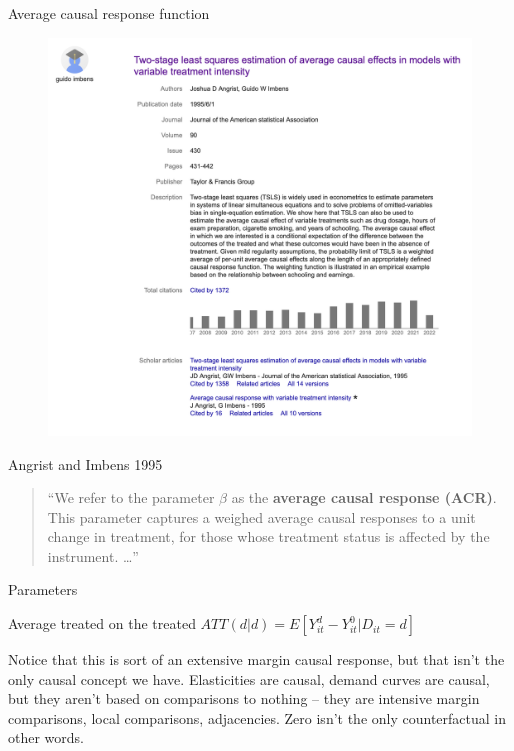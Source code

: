 \documentclass{beamer}
\begin{document}
\begin{frame}{Average causal response function}

\begin{figure}
\begin{center}
             \includegraphics[scale=0.3]{./lecture_includes/angrist_imbens_IV_intensity}
\end{center}
\end{figure}

\end{frame}


\begin{frame}{Angrist and Imbens 1995}

\begin{quote}
``We refer to the parameter $\beta$ as the \textbf{average causal response (ACR)}. This parameter captures a weighed average causal responses to a unit change in treatment, for those whose treatment status is affected by the instrument. \dots ''
\end{quote}

\end{frame}

\begin{frame}{Parameters}

\begin{block}{Average treated on the treated}
$ATT(d|d) = E[Y^d_{it} - Y^0_{it} | D_{it}=d]$
\end{block}

\bigskip

Notice that this is sort of an extensive margin causal response, but that isn't the only causal concept we have.  Elasticities are causal, demand curves are causal, but they aren't based on comparisons to nothing -- they are intensive margin comparisons, local comparisons, adjacencies. Zero isn't the only counterfactual in other words.

\end{frame}
\end{document}
